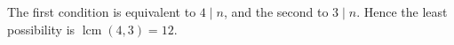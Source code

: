 The first condition is equivalent to $4\mid n$, and the second to $3\mid n$. Hence the least possibility is $\operatorname{lcm}(4,3)=\boxed{12}$.
